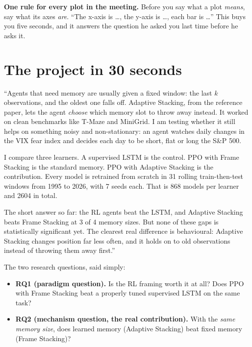 \documentclass[11pt,a4paper]{article}
\begin{document}
\textbf{One rule for every plot in the meeting.} Before you say what a plot \emph{means},
say what its axes \emph{are}. ``The x-axis is \ldots, the y-axis is \ldots, each bar is \ldots''
This buys you five seconds, and it answers the question he asked you last time before he
asks it.

\section{The project in 30 seconds}

\begin{sayit}
``Agents that need memory are usually given a fixed window: the last $k$ observations, and
the oldest one falls off. Adaptive Stacking, from the reference paper, lets the agent \emph{choose}
which memory slot to throw away instead. It worked on clean benchmarks like T-Maze and
MiniGrid. I am testing whether it still helps on something noisy and non-stationary: an
agent watches daily changes in the VIX fear index and decides each day to be short, flat
or long the S\&P 500.

I compare three learners. A supervised LSTM is the control. PPO with Frame Stacking is the
standard memory. PPO with Adaptive Stacking is the contribution. Every model is retrained
from scratch in 31 rolling train-then-test windows from 1995 to 2026, with 7 seeds each.
That is 868 models per learner and 2604 in total.

The short answer so far: the RL agents beat the LSTM, and Adaptive Stacking beats Frame
Stacking at 3 of 4 memory sizes. But none of these gaps is statistically significant
yet. The clearest real difference is behavioural: Adaptive Stacking changes position far
less often, and it holds on to old observations instead of throwing them away first.''
\end{sayit}

The two research questions, said simply:
\begin{itemize}
  \item \textbf{RQ1 (paradigm question).} Is the RL framing worth it at all? Does PPO with
        Frame Stacking beat a properly tuned supervised LSTM on the same task?
  \item \textbf{RQ2 (mechanism question, the real contribution).} With the \emph{same memory
        size}, does learned memory (Adaptive Stacking) beat fixed memory (Frame Stacking)?
\end{itemize}
\end{document}
